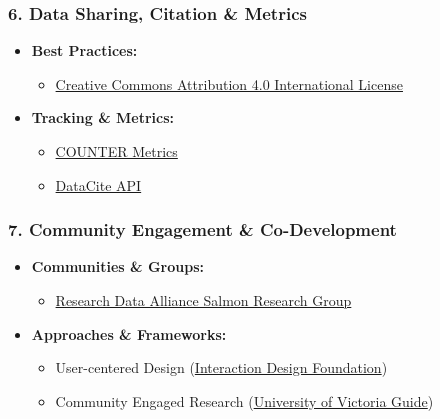 \documentclass[
  letterpaper,
  DIV=11,
  numbers=noendperiod]{scrartcl}
\providecommand{\tightlist}{%
  \setlength{\itemsep}{0pt}\setlength{\parskip}{0pt}}\usepackage{longtable,booktabs,array}
\begin{document}
\subsubsection{6. Data Sharing, Citation \&
Metrics}\label{data-sharing-citation-metrics}

\begin{itemize}
\tightlist
\item
  \textbf{Best Practices:}

  \begin{itemize}
  \tightlist
  \item
    \href{https://creativecommons.org/licenses/by/4.0/}{Creative Commons
    Attribution 4.0 International License}
  \end{itemize}
\item
  \textbf{Tracking \& Metrics:}

  \begin{itemize}
  \tightlist
  \item
    \href{https://www.projectcounter.org/}{COUNTER Metrics}
  \item
    \href{https://datacite.org/service.html}{DataCite API}
  \end{itemize}
\end{itemize}

\subsubsection{7. Community Engagement \&
Co-Development}\label{community-engagement-co-development}

\begin{itemize}
\tightlist
\item
  \textbf{Communities \& Groups:}

  \begin{itemize}
  \tightlist
  \item
    \href{https://rd-alliance.org/groups/salmon-data-management}{Research
    Data Alliance Salmon Research Group}
  \end{itemize}
\item
  \textbf{Approaches \& Frameworks:}

  \begin{itemize}
  \tightlist
  \item
    User-centered Design
    (\href{https://www.interaction-design.org/literature/topics/user-centered-design}{Interaction
    Design Foundation})
  \item
    Community Engaged Research
    (\href{https://www.uvic.ca/research/assets/docs/Community-Engaged-Research.pdf}{University
    of Victoria Guide})
  \end{itemize}
\end{itemize}
\end{document}
